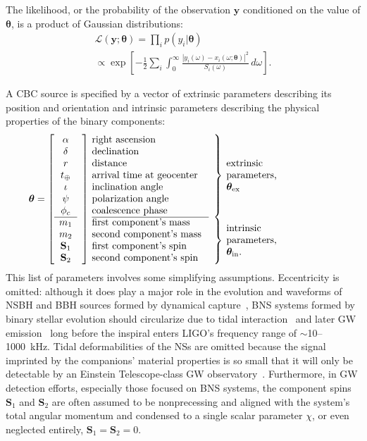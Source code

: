 \documentclass[amsmath,amssymb,aps,prx,reprint,nopreprintnumbers,nofootinbib]{revtex4-1}
\begin{document}
The likelihood, or the probability of the observation $\mathbf y$ conditioned on the value of $\bm\theta$, is a product of Gaussian distributions:
%
\begin{multline}\label{eq:gaussian-likelihood}
    \mathcal{L}(\mathbf y; \bm\theta) = \prod_i p(y_i | \bm\theta)
        \\ \propto \exp \left[
        - \frac{1}{2} \sum_i \int_0^\infty \frac{\left|y_i (\omega)
            - x_i(\omega; \bm\theta) \right|^2}{S_i(\omega)} \, d\omega
    \right].
\end{multline}

A \ac{CBC} source is specified by a vector of extrinsic parameters describing its position and orientation and intrinsic parameters describing the physical properties of the binary components:
%
\begin{equation}
    \bm\theta = \left[
    \begin{array}{cl@{\quad}p{4cm}lp{3.75cm}}
        \alpha & \rdelim]{11}{0mm} & right ascension & \rdelim\}{7}{1mm} & \multirow{7}{2cm}{extrinsic parameters, $\bm\theta_\mathrm{ex}$} \\
        \delta && declination & \\
        r && distance & \\
        t_\oplus && arrival time at geocenter & \\
        \iota && inclination angle & \\
        \psi && polarization angle & \\
        \phi_c && coalescence phase & \\
        \cline{1-1}\cline{3-3}
        m_1 && first component's mass & \rdelim\}{4}{1mm} & \multirow{4}{2cm}{intrinsic parameters, $\bm\theta_\mathrm{in}$.}\\
        m_2 && second component's mass & \\
        \mathbf S_1 && first component's spin & \\
        \mathbf S_2 && second component's spin & \\
    \end{array}\right.
\end{equation}
%
This list of parameters involves some simplifying assumptions. Eccentricity is omitted: although it does play a major role in the evolution and waveforms of \ac{NSBH} and \ac{BBH} sources formed by dynamical capture~\cite{PhysRevD.87.043004}, \ac{BNS} systems formed by binary stellar evolution should circularize due to tidal interaction~\cite{0004-637X-572-1-407} and later \ac{GW} emission~\cite{PhysRev.136.B1224} long before the inspiral enters LIGO's frequency range of $\sim$10\nobreakdashes--1000~kHz. Tidal deformabilities of the \acp{NS} are omitted because the signal imprinted by the companions' material properties is so small that it will only be detectable by an Einstein Telescope\nobreakdashes-class \ac{GW} observatory~\cite{PhysRevD.81.123016}. Furthermore, in \ac{GW} detection efforts, especially those focused on \ac{BNS} systems, the component spins $\mathbf{S}_1$ and $\mathbf{S}_2$ are often assumed to be nonprecessing and aligned with the system's total angular momentum and condensed to a single scalar parameter $\chi$, or even neglected entirely, $\mathbf{S}_1 = \mathbf{S}_2 = 0$.
\end{document}
